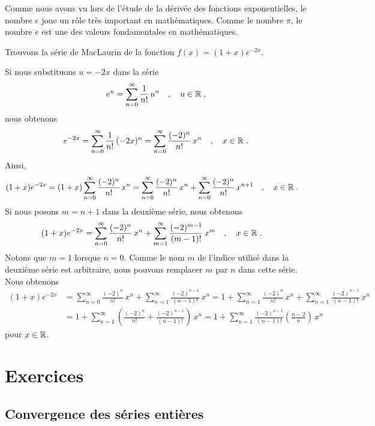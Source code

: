 {Comme nous avons vu lors de l'étude de la dérivée des fonctions
exponentielles, le nombre $e$ joue un rôle très important en
mathématiques.  Comme le nombre $\pi$, le nombre $e$ est une des
valeurs fondamentales en mathématiques.

\begin{egg}
Trouvons la série de MacLaurin de la fonction $f(x) = (1+x)e^{-2x}$.

Si nous substituons $u=-2x$ dans la série
\[
e^u= \sum_{n=0}^\infty \frac{1}{n!}\, u^n \quad , \quad u \in \mathbb{R}
\; ,
\]
nous obtenons
\[
e^{-2x} = \sum_{n=0}^\infty \frac{1}{n!}\, (-2x)^n
= \sum_{n=0}^\infty \frac{(-2)^n}{n!}\, x^n \quad , \quad x \in \mathbb{R}
\; .
\]
Ainsi,
\begin{align*}
(1+x)e^{-2x} &= (1+x) \sum_{n=0}^\infty \frac{(-2)^n}{n!}\, x^n
= \sum_{n=0}^\infty \frac{(-2)^n}{n!}\, x^n +
\sum_{n=0}^\infty \frac{(-2)^n}{n!}\, x^{n+1} \quad , \quad x \in \mathbb{R}
\; .
\end{align*}
Si nous posons $m=n+1$ dans la deuxième série, nous obtenons
\begin{align*}
(1+x)e^{-2x} &= \sum_{n=0}^\infty \frac{(-2)^n}{n!}\, x^n +
\sum_{m=1}^\infty \frac{(-2)^{m-1}}{(m-1)!}\, x^m  \quad , \quad x \in
\mathbb{R} \; .
\end{align*}
Notons que $m=1$ lorsque $n=0$.  Comme le nom $m$ de l'indice utilisé dans
la deuxième série est arbitraire, nous pouvons remplacer $m$ par $n$ dans cette
série.  Nous obtenons
\begin{align*}
(1+x)e^{-2x} &= \sum_{n=0}^\infty \frac{(-2)^n}{n!}\, x^n +
\sum_{n=1}^\infty \frac{(-2)^{n-1}}{(n-1)!}\, x^n
=  1 + \sum_{n=1}^\infty \frac{(-2)^n}{n!}\, x^n +
\sum_{n=1}^\infty \frac{(-2)^{n-1}}{(n-1)!}\, x^n \\
&=  1 + \sum_{n=1}^\infty \left( \frac{(-2)^n}{n!} +
\frac{(-2)^{n-1}}{(n-1)!} \right)\, x^n
=  1 + \sum_{n=1}^\infty \frac{(-2)^{n-1}}{(n-1)!} \left(
\frac{n-2}{n} \right)\, x^n
\end{align*}
pour $x \in \mathbb{R}$.
\end{egg}

}  %

\section{Exercices}

\subsection{Convergence des séries entières}

